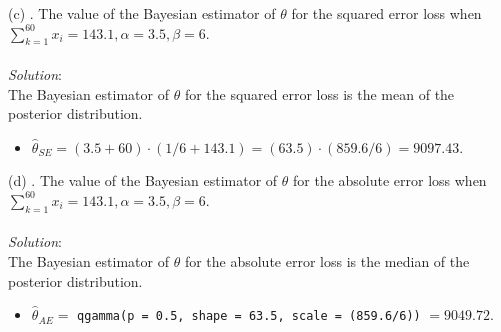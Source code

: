 \documentclass[12pt]{article}
\newcommand{\XB}{\color{black}}
\newcommand{\XBB}{\color{blue}}
\newcommand{\ds}{\displaystyle}
\begin{document}
\vspace{2.5mm}

(c) . The value of the Bayesian estimator of $ \theta $ for the squared error loss when \\
$ \sum_{k=1}^{60} x_{i} = 143.1, \alpha = 3.5, \beta = 6 $. \\
\vspace{2.5mm} \\
\textit{Solution}:
\vspace{2.5mm} \\

\noindent
The Bayesian estimator of $ \theta $ for the squared error loss is the mean of the posterior distribution. \\

\begin{itemize}
    \item $ \ds \hat{\theta}_{SE} = (3.5 + 60) \cdot (1 / 6 + 143.1) = (63.5) \cdot (859.6 / 6) = 9097.43$.
\end{itemize}

\vspace{2.5mm}

(d) . The value of the Bayesian estimator of $ \theta $ for the absolute error loss when \\
$ \sum_{k=1}^{60} x_{i} = 143.1, \alpha = 3.5, \beta = 6 $. \\
\vspace{2.5mm} \\
\textit{Solution}:
\vspace{2.5mm} \\

\noindent
The Bayesian estimator of $ \theta $ for the absolute error loss is the median of the posterior distribution. \\

\begin{itemize}
    \item $ \ds \hat{\theta}_{AE} = $ {\XBB \texttt{qgamma(p = 0.5, shape = 63.5, scale = (859.6/6))}} $ = 9049.72 $.
\end{itemize}

\vspace{2.5mm}

\newpage
\XBB\hrulefill\XB \\
\end{document}
